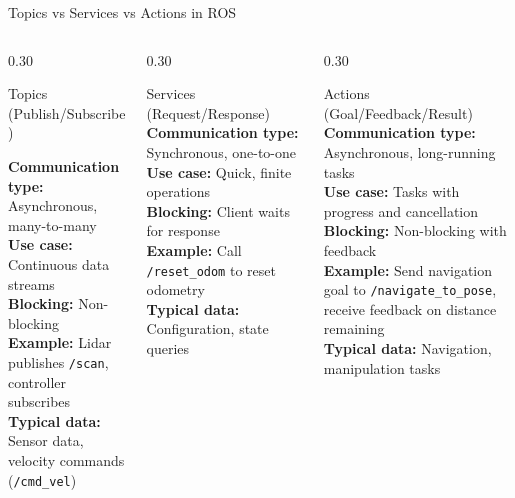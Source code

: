\documentclass[aspectratio=169]{beamer}
\begin{document}
\begin{frame}[t]{Topics vs Services vs Actions in ROS}

\vspace*{-0.8cm}

\begin{columns}[T,onlytextwidth]
    \footnotesize
    \begin{column}{0.30\textwidth}
        \begin{alertblock}{Topics (Publish/Subscribe)}
            
    \textbf{Communication type:} Asynchronous, many-to-many\\
    \textbf{Use case:} Continuous data streams\\
    \textbf{Blocking:} Non-blocking\\
    \textbf{Example:} Lidar publishes \texttt{/scan}, controller subscribes\\
    \textbf{Typical data:} Sensor data, velocity commands (\texttt{/cmd\_vel})\\
        \end{alertblock}
    \end{column}
    \begin{column}{0.30\textwidth}
        \begin{alertblock}{Services (Request/Response)}
    \textbf{Communication type:} Synchronous, one-to-one \\
    \textbf{Use case:} Quick, finite operations \\
    \textbf{Blocking:} Client waits for response \\
    \textbf{Example:} Call \texttt{/reset\_odom} to reset odometry\\
    \textbf{Typical data:} Configuration, state queries \\
            
        \end{alertblock}
    \end{column}
        \begin{column}{0.30\textwidth}
            \begin{alertblock}{Actions (Goal/Feedback/Result)}
                \textbf{Communication type:} Asynchronous, long-running tasks \\
\textbf{Use case:} Tasks with progress and cancellation \\
\textbf{Blocking:} Non-blocking with feedback \\
\textbf{Example:} Send navigation goal to \texttt{/navigate\_to\_pose}, receive feedback on distance remaining\\
\textbf{Typical data:} Navigation, manipulation tasks
            \end{alertblock}

    \end{column}
\end{columns}

\end{frame}
\end{document}
